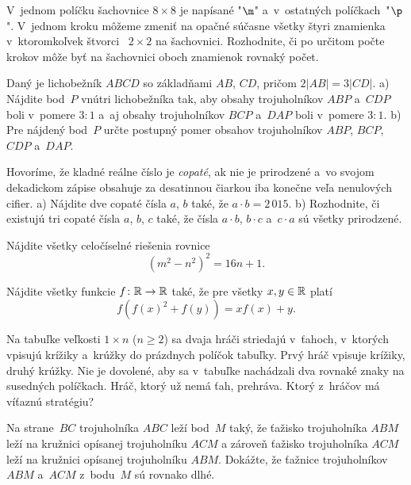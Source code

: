 {%
V~jednom políčku šachovnice $8\times8$ je napísané "$\m$" a~v~ostatných políčkach~"$\p$".
V~jednom kroku môžeme zmeniť na opačné súčasne všetky štyri znamienka v~ktoromkoľvek štvorci~
$2\times2$ na šachovnici. Rozhodnite, či po určitom počte krokov môže
byť na šachovnici oboch znamienok rovnaký počet.}

{%
Daný je lichobežník $ABCD$ so základňami $AB$, $CD$, pričom $2|AB|=3|CD|$.
\ite a) Nájdite bod~$P$ vnútri lichobežníka tak, aby obsahy trojuholníkov $ABP$
a~$CDP$ boli v~pomere $3:1$ a~aj obsahy trojuholníkov $BCP$ a~$DAP$ boli v~pomere $3:1$.
\ite b) Pre nájdený bod~$P$ určte postupný pomer obsahov trojuholníkov $ABP$, $BCP$, $CDP$ a~$DAP$.\endgraf}

{%
Hovoríme, že kladné reálne číslo je {\it copaté}, ak nie je prirodzené
a~vo svojom dekadickom zápise obsahuje za desatinnou čiarkou iba konečne veľa
nenulových cifier.
\ite a) Nájdite dve copaté čísla $a$, $b$ také, že $a\cdot b =2\,015$.
\ite b) Rozhodnite, či existujú tri copaté čísla $a$, $b$, $c$ také,
že čísla $a\cdot b$, $b\cdot c$ a~$c\cdot a$ sú všetky prirodzené.\endgraf}

{%
Nájdite všetky celočíselné riešenia rovnice
$$
(m^2-n^2)^2=16n+1.
$$}

{%
Nájdite všetky funkcie $f\colon \Bbb R\to\Bbb R$ také, že pre všetky $x,y\in\Bbb R$ platí
$$
f\left(f(x)^2 + f(y)\right) = xf(x) + y.
$$}

{%
Na tabuľke veľkosti $1\times n$ ($n\ge2$) sa dvaja hráči striedajú v~ťahoch, v~ktorých vpisujú krížiky a~krúžky do prázdnych políčok tabuľky. Prvý hráč vpisuje krížiky, druhý krúžky. Nie je dovolené, aby sa v~tabuľke nachádzali dva rovnaké znaky na susedných políčkach. Hráč, ktorý už nemá ťah, prehráva. Ktorý z~hráčov má víťaznú stratégiu?}

{%
Na strane~$BC$ trojuholníka $ABC$ leží bod~$M$ taký, že ťažisko trojuholníka
$ABM$ leží na kružnici opísanej trojuholníku $ACM$ a zároveň ťažisko trojuholníka $ACM$ leží na kružnici opísanej trojuholníku $ABM$. Dokážte, že
ťažnice trojuholníkov $ABM$ a~$ACM$ z~bodu~$M$ sú rovnako dlhé.}

